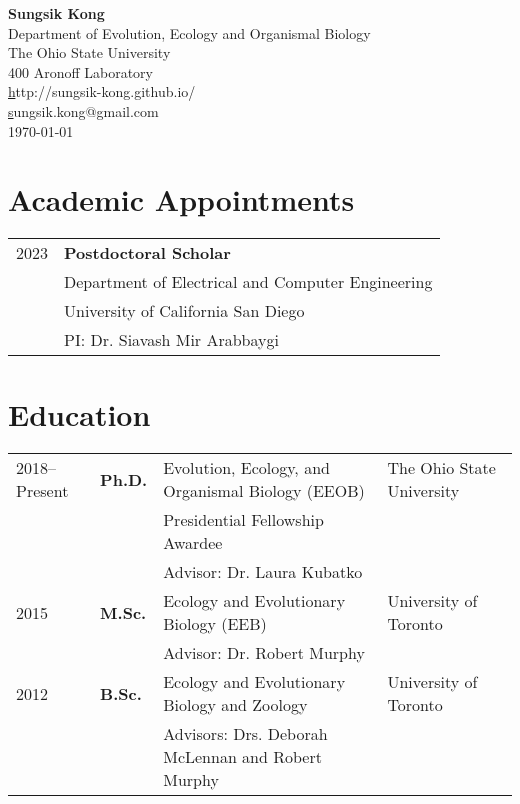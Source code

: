 \documentclass[11pt]{article}
\begin{document}
\pagestyle{plain}
\lhead{\today}

\begin{center}
\huge \textbf{Sungsik Kong}\\
\vspace{0.2cm}
\large Department of Evolution, Ecology and Organismal Biology\\
\large The Ohio State University\\
\large 400 Aronoff Laboratory\\
\small \href{http://sungsik-kong.github.io}http://sungsik-kong.github.io/\\
\small \href{mailto:sungsik.kong@gmail.com}sungsik.kong@gmail.com\\
\tiny \today
\end{center}



\hspace{0pt}

\section*{Academic Appointments}
\begin{longtable}{p{}  p{}}
2023 & \textbf{Postdoctoral Scholar}\\
& Department of Electrical and Computer Engineering \\
& University of California San Diego\\
& PI: Dr. Siavash Mir Arabbaygi
\end{longtable}


\section*{Education}

\begin{longtable}{p{}  p{} p{} p{}}
2018--Present & \textbf{Ph.D.} & Evolution, Ecology, and Organismal Biology (EEOB) & The Ohio State University\\
 & & Presidential Fellowship Awardee\\
 & & Advisor: Dr. Laura Kubatko\\
2015 & \textbf{M.Sc.} & Ecology and Evolutionary Biology (EEB) & University of Toronto\\
 & & Advisor: Dr. Robert Murphy\\
2012 & \textbf{B.Sc.} & Ecology and Evolutionary Biology and Zoology & University of Toronto\\
 & & Advisors: Drs. Deborah McLennan and Robert Murphy
\end{longtable}
\end{document}
